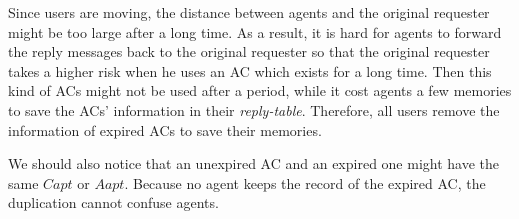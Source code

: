 Since users are moving, the distance between agents and the original requester might be too large after a long time. As a result, it is hard for agents to forward the reply messages back to the original requester so that the original requester takes a higher risk when he uses an AC which exists for a long time. Then this kind of ACs might not be used after a period, while it cost agents a few memories to save the ACs' information in their \textit{reply-table}. Therefore, all users remove the information of expired ACs to save their memories.

We should also notice that an unexpired AC and an expired one might have the same $Capt$ or $Aapt$. Because no agent keeps the record of the expired AC, the duplication cannot confuse agents.





